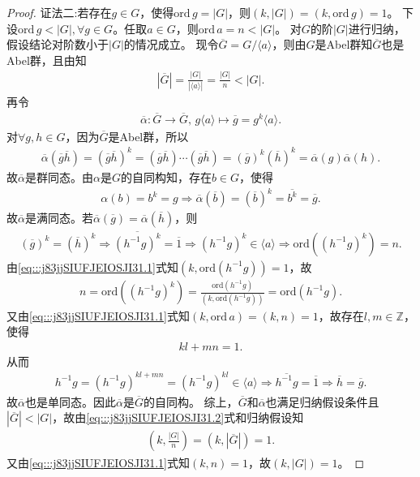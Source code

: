 \documentclass[../../main.tex]{subfiles}%
\begin{document}
\begin{proof}
{\color{blue}证法二:}若存在$g\in G$，使得$\mathrm{ord}\,g=|G|$，则$(k,|G|)=(k,\mathrm{ord}\,g)=1$。
下设$\mathrm{ord}\,g<|G|,\forall g\in G$。任取$a\in G$，则$\mathrm{ord}\,a=n<|G|$。
对$G$的阶$|G|$进行归纳，假设结论对阶数小于$|G|$的情况成立。
现令$\overline{G}=G/\langle a\rangle$，则由$G$是Abel群知$\overline{G}$也是Abel群，且由知
\begin{align}
|\overline{G}|=\frac{|G|}{|\langle a\rangle|}=\frac{|G|}{n}<|G|.
\label{eq:::j83jjSIUFJEIOSJI31.2}
\end{align}
再令
\begin{align*}
\overline{\alpha}:\overline{G}\to\overline{G},\, g\langle a\rangle\mapsto \overline{g}=g^k\langle a\rangle.
\end{align*}
对$\forall g,h\in G$，因为$\overline{G}$是Abel群，所以
\begin{align*}
\overline{\alpha}(\overline{g}\overline{h})=(\overline{g}\overline{h})^k=(\overline{g}\overline{h})\cdots(\overline{g}\overline{h})=(\overline{g})^k(\overline{h})^k=\overline{\alpha}(g)\overline{\alpha}(h).
\end{align*}
故$\overline{\alpha}$是群同态。由$\alpha$是$G$的自同构知，存在$b\in G$，使得
\begin{align*}
\alpha(b)=b^k=g\Longrightarrow \overline{\alpha}(\overline{b})=(\overline{b})^k=\overline{b^k}=\overline{g}.
\end{align*}
故$\overline{\alpha}$是满同态。若$\overline{\alpha}(\overline{g})=\overline{\alpha}(\overline{h})$，则
\begin{align*}
(\overline{g})^k=(\overline{h})^k\Longrightarrow \overline{(h^{-1}g)^k}=\overline{1}\Longrightarrow (h^{-1}g)^k\in\langle a\rangle\Longrightarrow \mathrm{ord}\left((h^{-1}g)^k\right)=n.
\end{align*}
由\eqref{eq:::j83jjSIUFJEIOSJI31.1}式知$(k,\mathrm{ord}(h^{-1}g))=1$，故
\begin{align*}
n=\mathrm{ord}\left((h^{-1}g)^k\right)=\frac{\mathrm{ord}(h^{-1}g)}{(k,\mathrm{ord}(h^{-1}g))}=\mathrm{ord}(h^{-1}g).
\end{align*}
又由\eqref{eq:::j83jjSIUFJEIOSJI31.1}式知$(k,\mathrm{ord}\,a)=(k,n)=1$，故存在$l,m\in\mathbb{Z}$，使得
\begin{align*}
kl+mn=1.
\end{align*}
从而
\begin{align*}
h^{-1}g=(h^{-1}g)^{kl+mn}=(h^{-1}g)^{kl}\in\langle a\rangle\Longrightarrow \overline{h^{-1}g}=\overline{1}\Longrightarrow \overline{h}=\overline{g}.
\end{align*}
故$\overline{\alpha}$也是单同态。因此$\overline{\alpha}$是$\overline{G}$的自同构。
综上，$\overline{G}$和$\overline{\alpha}$也满足归纳假设条件且$|\overline{G}|<|G|$，故由\eqref{eq:::j83jjSIUFJEIOSJI31.2}式和归纳假设知
\begin{align*}
\left(k,\frac{|G|}{n}\right)=(k,|\overline{G}|)=1.
\end{align*}
又由\eqref{eq:::j83jjSIUFJEIOSJI31.1}式知$(k,n)=1$，故$(k,|G|)=1$。

\end{proof}
\end{document}
